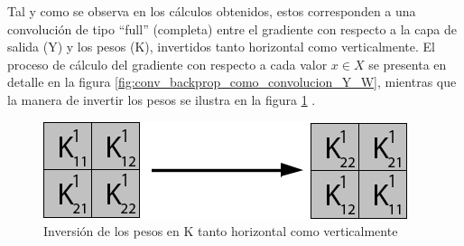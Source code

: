 Tal y como se observa en los cálculos obtenidos, estos corresponden a una convolución de tipo ``full'' (completa) entre el gradiente con respecto a la capa de salida (Y) y los pesos (K), invertidos tanto horizontal como verticalmente. El proceso de cálculo del gradiente con respecto a cada valor $x \in X$ se presenta en detalle en la figura \ref{fig:conv_backprop_como_convolucion_Y_W}, mientras que la manera de invertir los pesos se ilustra en la figura \ref{fig:flip_W} \cite{conv_backprop}.

\begin{figure}[H]
	\centering
	\includegraphics[width=0.8\linewidth]{imagenes/flip_pesos.jpg}  
	\caption{Inversión de los pesos en K tanto horizontal como verticalmente}
	\label{fig:flip_W}
\end{figure}

